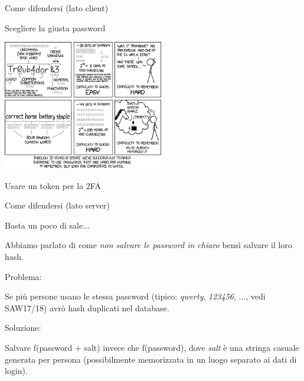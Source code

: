 \documentclass[handout, xcolor=dvipsnames,aspectratio=169]{beamer}
\begin{document}
\begin{frame}{Come difendersi (lato client)}

\centering

Scegliere la giusta password

\includegraphics[width=7cm]{img/xkcd}

Usare un token per la 2FA

\end{frame}


\begin{frame}{Come difendersi (lato server)}
  
  Basta un poco di sale...
  
  \medskip

  \pause
  Abbiamo parlato di come \textit{non salvare le password in chiaro} bensì salvare il loro hash.
  
  \medskip
  \pause

  Problema: 
  
  Se più persone usano le stessa password (tipico: \textit{qwerty}, \textit{123456}, ..., vedi SAW17/18) avrò hash duplicati nel database.
  
  \medskip
  \pause
  Soluzione: 
  
  Salvare f(password + salt) invece che f(password), dove \textit{salt} è una stringa casuale generata per persona (possibilmente memorizzata in un luogo separato ai dati di login).
  
\end{frame}
\end{document}
